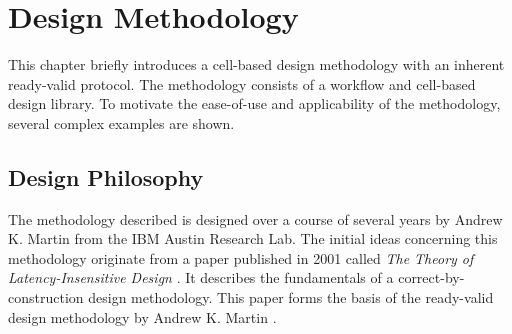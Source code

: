 \chapter{Design Methodology}
\label{ch:method}
This chapter briefly introduces a cell-based design methodology with an inherent ready-valid protocol. The methodology consists of a workflow and cell-based design library. To motivate the ease-of-use and applicability of the methodology, several complex examples are shown.






\section{Design Philosophy}
The methodology described is designed over a course of several years by Andrew K. Martin from the IBM Austin Research Lab. The initial ideas concerning this methodology originate from a paper published in 2001 called \textit{The Theory of Latency-Insensitive Design} \cite{delay-insensitive}. It describes the fundamentals of a correct-by-construction design methodology. This paper forms the basis of the ready-valid design methodology by Andrew K. Martin \cite{andy}.



